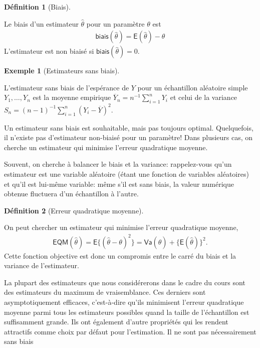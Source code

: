 \documentclass[
  11pt,
  letterpaper,
]{scrbook}
\theoremstyle{definition}
\newtheorem{definition}{Définition}[chapter]
\theoremstyle{definition}
\newtheorem{example}{Exemple}[chapter]
\theoremstyle{remark}
\begin{document}
\begin{definition}[Biais]\protect\hypertarget{def-biais}{}\label{def-biais}

Le biais d'un estimateur \(\hat{\theta}\) pour un paramètre \(\theta\)
est \begin{align*}
\mathsf{biais}(\hat{\theta})=\mathsf{E}(\hat{\theta})- \theta
\end{align*} L'estimateur est non biaisé si
\(\mathsf{biais}(\hat{\theta})=0\).

\end{definition}

\begin{example}[Estimateurs sans
biais]\protect\hypertarget{exm-estimateurs-non-biaises}{}\label{exm-estimateurs-non-biaises}

L'estimateur sans biais de l'espérance de \(Y\) pour un échantillon
aléatoire simple \(Y_1, \ldots, Y_n\) est la moyenne empirique
\(\overline{Y}_n = n^{-1} \sum_{i=1}^n Y_i\) et celui de la variance
\(S_n = (n-1)^{-1} \sum_{i=1}^n (Y_i-\overline{Y})^2\).

\end{example}

Un estimateur sans biais est souhaitable, mais pas toujours optimal.
Quelquefois, il n'existe pas d'estimateur non-biaisé pour un paramètre!
Dans plusieurs cas, on cherche un estimateur qui minimise l'erreur
quadratique moyenne.

Souvent, on cherche à balancer le biais et la variance: rappelez-vous
qu'un estimateur est une variable aléatoire (étant une fonction de
variables aléatoires) et qu'il est lui-même variable: même s'il est sans
biais, la valeur numérique obtenue fluctuera d'un échantillon à l'autre.

\begin{definition}[Erreur quadratique
moyenne]\protect\hypertarget{def-eqm}{}\label{def-eqm}

On peut chercher un estimateur qui minimise l'erreur quadratique
moyenne, \begin{align*}
\mathsf{EQM}(\hat{\theta}) = \mathsf{E}\{(\hat{\theta}-\theta)^2\}=\mathsf{Va}(\hat{\theta}) + \{\mathsf{E}(\hat{\theta})\}^2.
\end{align*} Cette fonction objective est donc un compromis entre le
carré du biais et la variance de l'estimateur.

\end{definition}

La plupart des estimateurs que nous considérerons dans le cadre du cours
sont des estimateurs du maximum de vraisemblance. Ces derniers sont
asymptotiquement efficaces, c'est-à-dire qu'ils minimisent l'erreur
quadratique moyenne parmi tous les estimateurs possibles quand la taille
de l'échantillon est suffisamment grande. Ils ont également d'autre
propriétés qui les rendent attractifs comme choix par défaut pour
l'estimation. Il ne sont pas nécessairement sans biais
\end{document}
